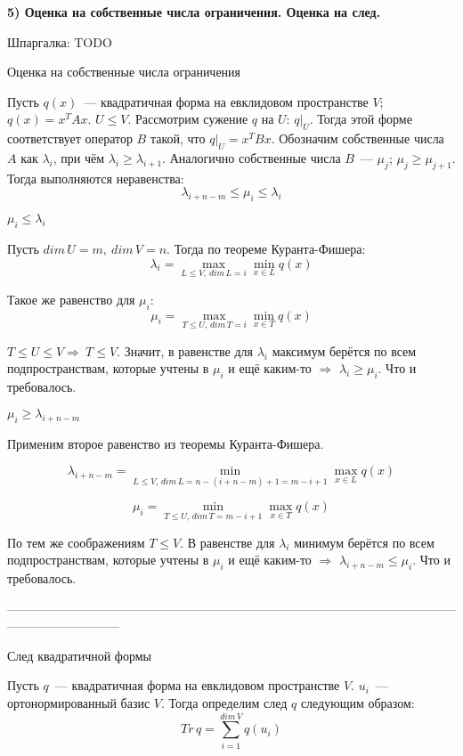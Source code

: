 {\bf5) Оценка на собственные числа ограничения. Оценка на след.}

Шпаргалка: TODO

\thrm Оценка на собственные числа ограничения

Пусть $q(x)$~--- квадратичная форма на евклидовом пространстве $V$; $q(x) = x^TAx$. $U \le V$. Рассмотрим сужение $q$ на $U$: $q|_U$. Тогда этой форме соответствует оператор $B$ такой, что $q|_U = x^TBx$. Обозначим собственные числа $A$ как $\lambda_i$, при чём $\lambda_i \ge \lambda_{i+1}$. Аналогично собственные числа $B$~--- $\mu_j$; $\mu_j\ge \mu_{j + 1}$. Тогда выполняются неравенства:
$$
\lambda_{i+n-m}\le\mu_i\le\lambda_i
$$

\proof

$\mu_i\le\lambda_i$

Пусть $dim\,U = m,\ dim\,V = n$. Тогда по теореме Куранта-Фишера:
$$
\lambda_i = \max\limits_{L \le V,\,dim\,L = i} \min\limits_{x\in L} q(x) 
$$

Такое же равенство для $\mu_i$:
$$
\mu_i = \max\limits_{T \le U,\,dim\,T = i} \min\limits_{x\in T} q(x) 
$$

$T\le U\le V\Rightarrow\ T\le V$. Значит, в равенстве для $\lambda_i$ максимум берётся по всем подпространствам, которые учтены в $\mu_i$ и ещё каким-то $\Rightarrow$ $\lambda_i \ge \mu_i$. Что и требовалось.

$\mu_i \ge \lambda_{i + n - m}$

Применим второе равенство из теоремы Куранта-Фишера.

$$
\lambda_{i+n-m} = \min\limits_{L \le V,\,dim\,L = n - (i + n - m) + 1 = m - i + 1} \max\limits_{x\in L} q(x) 
$$

$$
\mu_i = \min\limits_{T \le U,\,dim\,T = m - i + 1} \max\limits_{x\in T} q(x) 
$$

По тем же соображениям $T \le V$. В равенстве для $\lambda_i$ минимум берётся по всем подпространствам, которые учтены в $\mu_i$ и ещё каким-то $\Rightarrow$ $\lambda_{i + n - m}\le \mu_i$. Что и требовалось.

\endproof
\ethrm

---------------------------------------------------------------------------------------------------------------------------------------

\dfn След квадратичной формы
\edfn

Пусть $q$~--- квадратичная форма на евклидовом пространстве $V$. $u_i$~--- ортонормированный базис $V$. Тогда определим след $q$ следующим образом:
$$
Tr\,q=\sum\limits_{i=1}^{dim\,V} q(u_i)
$$

